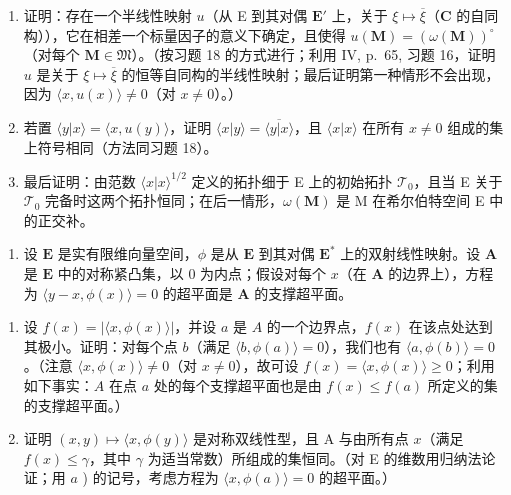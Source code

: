 \begin{enumerate}
\def\labelenumi{\alph{enumi})}
\item
  证明：存在一个半线性映射 \(u\)（从 E 到其对偶 \(\mathbf{E}'\) 上，关于 \(\xi \mapsto \overline{\xi}\)（\(\mathbf{C}\) 的自同构）），它在相差一个标量因子的意义下确定，且使得 \(u(\mathbf{M}) = (\omega(\mathbf{M}))^\circ\)（对每个 \(\mathbf{M} \in \mathfrak{M}\)）。（按习题 18 的方式进行；利用 IV, p.~65, 习题 16，证明 \(u\) 是关于 \(\xi \mapsto \overline{\xi}\) 的恒等自同构的半线性映射；最后证明第一种情形不会出现，因为 \(\langle x, u(x) \rangle \neq 0\)（对 \(x \neq 0\)）。）
\item
  若置 \(\langle y|x\rangle = \langle x,u(y)\rangle\)，证明 \(\langle x|y\rangle = \overline{\langle y|x\rangle}\)，且 \(\langle x|x\rangle\) 在所有 \(x\neq 0\) 组成的集上符号相同（方法同习题 18）。
\item
  最后证明：由范数 \(\langle x|x\rangle^{1 / 2}\) 定义的拓扑细于 E 上的初始拓扑 \(\mathcal{T}_0\)，且当 E 关于 \(\mathcal{T}_0\) 完备时这两个拓扑恒同；在后一情形，\(\omega (\mathbf{M})\) 是 M 在希尔伯特空间 E 中的正交补。
\end{enumerate}

\begin{enumerate}
\def\labelenumi{\arabic{enumi})}
\setcounter{enumi}{19}
\tightlist
\item
  设 \(\mathbf{E}\) 是实有限维向量空间，\(\phi\) 是从 \(\mathbf{E}\) 到其对偶 \(\mathbf{E}^*\) 上的双射线性映射。设 \(\mathbf{A}\) 是 \(\mathbf{E}\) 中的对称紧凸集，以 0 为内点；假设对每个 \(x\)（在 \(\mathbf{A}\) 的边界上），方程为 \(\langle y - x, \phi(x) \rangle = 0\) 的超平面是 \(\mathbf{A}\) 的支撑超平面。
\end{enumerate}

\begin{enumerate}
\def\labelenumi{\alph{enumi})}
\item
  设 \(f(x) = |\langle x, \phi(x) \rangle|\)，并设 \(a\) 是 \(A\) 的一个边界点，\(f(x)\) 在该点处达到其极小。证明：对每个点 \(b\)（满足 \(\langle b, \phi(a) \rangle = 0\)），我们也有 \(\langle a, \phi(b) \rangle = 0\)。（注意 \(\langle x, \phi(x) \rangle \neq 0\)（对 \(x \neq 0\)），故可设 \(f(x) = \langle x, \phi(x) \rangle \geqslant 0\)；利用如下事实：\(A\) 在点 \(a\) 处的每个支撑超平面也是由 \(f(x) \leqslant f(a)\) 所定义的集的支撑超平面。）
\item
  证明 \((x, y) \mapsto \langle x, \phi(y) \rangle\) 是对称双线性型，且 A 与由所有点 \(x\)（满足 \(f(x) \leqslant \gamma\)，其中 \(\gamma\) 为适当常数）所组成的集恒同。（对 E 的维数用归纳法论证；用 \(a\) ) 的记号，考虑方程为 \(\langle x, \phi(a) \rangle = 0\) 的超平面。）
\end{enumerate}

